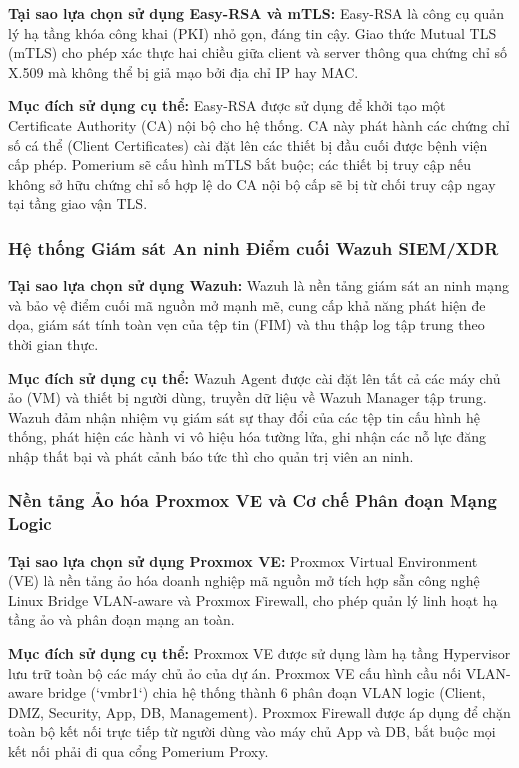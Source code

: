 \textbf{Tại sao lựa chọn sử dụng Easy-RSA và mTLS:} Easy-RSA là công cụ quản lý hạ tầng khóa công khai (PKI) nhỏ gọn, đáng tin cậy. Giao thức Mutual TLS (mTLS) cho phép xác thực hai chiều giữa client và server thông qua chứng chỉ số X.509 mà không thể bị giả mạo bởi địa chỉ IP hay MAC.

\textbf{Mục đích sử dụng cụ thể:} Easy-RSA được sử dụng để khởi tạo một Certificate Authority (CA) nội bộ cho hệ thống. CA này phát hành các chứng chỉ số cá thể (Client Certificates) cài đặt lên các thiết bị đầu cuối được bệnh viện cấp phép. Pomerium sẽ cấu hình mTLS bắt buộc; các thiết bị truy cập nếu không sở hữu chứng chỉ số hợp lệ do CA nội bộ cấp sẽ bị từ chối truy cập ngay tại tầng giao vận TLS.

\subsubsection{Hệ thống Giám sát An ninh Điểm cuối Wazuh SIEM/XDR}

\textbf{Tại sao lựa chọn sử dụng Wazuh:} Wazuh là nền tảng giám sát an ninh mạng và bảo vệ điểm cuối mã nguồn mở mạnh mẽ, cung cấp khả năng phát hiện đe dọa, giám sát tính toàn vẹn của tệp tin (FIM) và thu thập log tập trung theo thời gian thực.

\textbf{Mục đích sử dụng cụ thể:} Wazuh Agent được cài đặt lên tất cả các máy chủ ảo (VM) và thiết bị người dùng, truyền dữ liệu về Wazuh Manager tập trung. Wazuh đảm nhận nhiệm vụ giám sát sự thay đổi của các tệp tin cấu hình hệ thống, phát hiện các hành vi vô hiệu hóa tường lửa, ghi nhận các nỗ lực đăng nhập thất bại và phát cảnh báo tức thì cho quản trị viên an ninh.

\subsubsection{Nền tảng Ảo hóa Proxmox VE và Cơ chế Phân đoạn Mạng Logic}

\textbf{Tại sao lựa chọn sử dụng Proxmox VE:} Proxmox Virtual Environment (VE) là nền tảng ảo hóa doanh nghiệp mã nguồn mở tích hợp sẵn công nghệ Linux Bridge VLAN-aware và Proxmox Firewall, cho phép quản lý linh hoạt hạ tầng ảo và phân đoạn mạng an toàn.

\textbf{Mục đích sử dụng cụ thể:} Proxmox VE được sử dụng làm hạ tầng Hypervisor lưu trữ toàn bộ các máy chủ ảo của dự án. Proxmox VE cấu hình cầu nối VLAN-aware bridge (`vmbr1`) chia hệ thống thành 6 phân đoạn VLAN logic (Client, DMZ, Security, App, DB, Management). Proxmox Firewall được áp dụng để chặn toàn bộ kết nối trực tiếp từ người dùng vào máy chủ App và DB, bắt buộc mọi kết nối phải đi qua cổng Pomerium Proxy.
